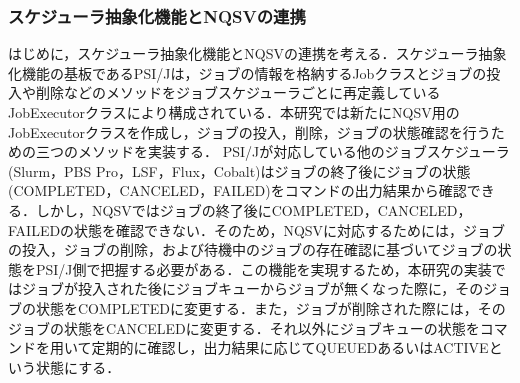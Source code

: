 \subsubsection{スケジューラ抽象化機能とNQSVの連携}
はじめに，スケジューラ抽象化機能とNQSVの連携を考える．スケジューラ抽象化機能の基板であるPSI/Jは，ジョブの情報を格納するJobクラスとジョブの投入や削除などのメソッドをジョブスケジューラごとに再定義しているJobExecutorクラスにより構成されている．本研究では新たにNQSV用のJobExecutorクラスを作成し，ジョブの投入，削除，ジョブの状態確認を行うための三つのメソッドを実装する．
PSI/Jが対応している他のジョブスケジューラ (Slurm，PBS Pro，LSF，Flux，Cobalt)はジョブの終了後にジョブの状態 (COMPLETED，CANCELED，FAILED)をコマンドの出力結果から確認できる．しかし，NQSVではジョブの終了後にCOMPLETED，CANCELED，FAILEDの状態を確認できない．そのため，NQSVに対応するためには，ジョブの投入，ジョブの削除，および待機中のジョブの存在確認に基づいてジョブの状態をPSI/J側で把握する必要がある．この機能を実現するため，本研究の実装ではジョブが投入された後にジョブキューからジョブが無くなった際に，そのジョブの状態をCOMPLETEDに変更する．また，ジョブが削除された際には，そのジョブの状態をCANCELEDに変更する．それ以外にジョブキューの状態をコマンドを用いて定期的に確認し，出力結果に応じてQUEUEDあるいはACTIVEという状態にする．\par
